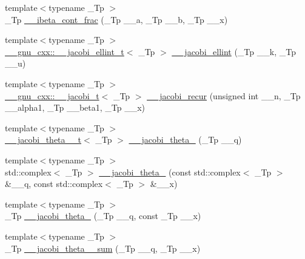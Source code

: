 \begin{DoxyCompactItemize}
{\footnotesize template$<$typename \+\_\+\+Tp $>$ }\\\+\_\+\+Tp \hyperlink{namespacestd_1_1____detail_a96a5a5205553de07f98b89b2e1f18000}{\+\_\+\+\_\+ibeta\+\_\+cont\+\_\+frac} (\+\_\+\+Tp \+\_\+\+\_\+a, \+\_\+\+Tp \+\_\+\+\_\+b, \+\_\+\+Tp \+\_\+\+\_\+x)
\item 
{\footnotesize template$<$typename \+\_\+\+Tp $>$ }\\\hyperlink{struct____gnu__cxx_1_1____jacobi__ellint__t}{\+\_\+\+\_\+gnu\+\_\+cxx\+::\+\_\+\+\_\+jacobi\+\_\+ellint\+\_\+t}$<$ \+\_\+\+Tp $>$ \hyperlink{namespacestd_1_1____detail_a9530210ed172894f6a2e2bf4ef7fd47d}{\+\_\+\+\_\+jacobi\+\_\+ellint} (\+\_\+\+Tp \+\_\+\+\_\+k, \+\_\+\+Tp \+\_\+\+\_\+u)
\item 
{\footnotesize template$<$typename \+\_\+\+Tp $>$ }\\\hyperlink{struct____gnu__cxx_1_1____jacobi__t}{\+\_\+\+\_\+gnu\+\_\+cxx\+::\+\_\+\+\_\+jacobi\+\_\+t}$<$ \+\_\+\+Tp $>$ \hyperlink{namespacestd_1_1____detail_a35edf888e09012d7059e690507ef42ad}{\+\_\+\+\_\+jacobi\+\_\+recur} (unsigned int \+\_\+\+\_\+n, \+\_\+\+Tp \+\_\+\+\_\+alpha1, \+\_\+\+Tp \+\_\+\+\_\+beta1, \+\_\+\+Tp \+\_\+\+\_\+x)
\item 
{\footnotesize template$<$typename \+\_\+\+Tp $>$ }\\\hyperlink{structstd_1_1____detail_1_1____jacobi__theta__0__t}{\+\_\+\+\_\+jacobi\+\_\+theta\+\_\+\_\+t}$<$ \+\_\+\+Tp $>$ \hyperlink{namespacestd_1_1____detail_a0e364088497dc54db0bd813d00929f1d}{\+\_\+\+\_\+jacobi\+\_\+theta\+\_} (\+\_\+\+Tp \+\_\+\+\_\+q)
\item 
{\footnotesize template$<$typename \+\_\+\+Tp $>$ }\\std\+::complex$<$ \+\_\+\+Tp $>$ \hyperlink{namespacestd_1_1____detail_a5174b10a8e5a884ce9d6eaf10c15450c}{\+\_\+\+\_\+jacobi\+\_\+theta\+\_} (const std\+::complex$<$ \+\_\+\+Tp $>$ \&\+\_\+\+\_\+q, const std\+::complex$<$ \+\_\+\+Tp $>$ \&\+\_\+\+\_\+x)
\item 
{\footnotesize template$<$typename \+\_\+\+Tp $>$ }\\\+\_\+\+Tp \hyperlink{namespacestd_1_1____detail_af98af6bb3dd83f6a28c777d8fbaa5e51}{\+\_\+\+\_\+jacobi\+\_\+theta\+\_} (\+\_\+\+Tp \+\_\+\+\_\+q, const \+\_\+\+Tp \+\_\+\+\_\+x)
\item 
{\footnotesize template$<$typename \+\_\+\+Tp $>$ }\\\+\_\+\+Tp \hyperlink{namespacestd_1_1____detail_adea964551a6650baebe13574d942bf50}{\+\_\+\+\_\+jacobi\+\_\+theta\+\_\+\_\+sum} (\+\_\+\+Tp \+\_\+\+\_\+q, \+\_\+\+Tp \+\_\+\+\_\+x)

\end{DoxyCompactItemize}
